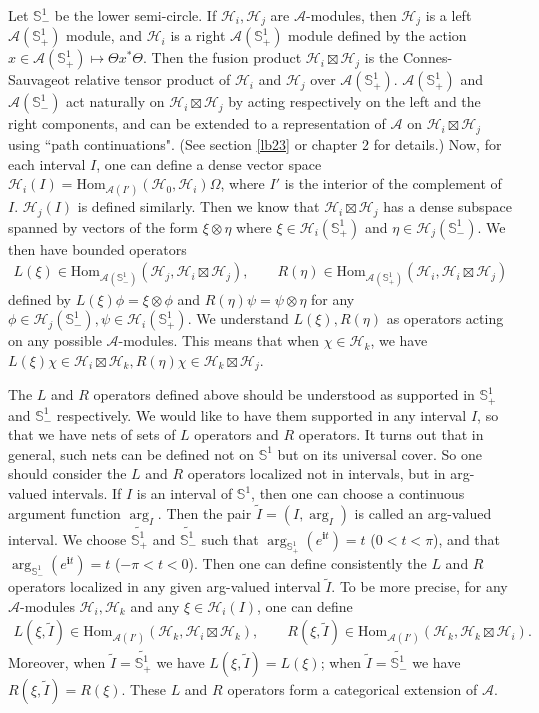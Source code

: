 \documentclass[12pt,a4paper]{article}
\theoremstyle{definition}
\theoremstyle{plain}
\newcommand{\mc}{\mathcal}
\newcommand{\wtd}{\widetilde}
\newcommand{\Hom}{\mathrm{Hom}}
\newcommand{\im}{\mathbf{i}}
\newcommand{\mbb}{\mathbb}
\numberwithin{equation}{section}
\begin{document}
Let $\mbb S^1_-$ be the lower semi-circle. If $\mc H_i,\mc H_j$ are $\mc A$-modules, then $\mc H_j$ is a left $\mc A(\mbb S^1_+)$ module, and $\mc H_i$ is a right $\mc A(\mbb S^1_+)$ module defined by the action $x\in\mc A(\mbb S^1_+)\mapsto \Theta x^*\Theta$. Then the fusion product $\mc H_i\boxtimes\mc H_j$ is the Connes-Sauvageot relative tensor product of $\mc H_i$ and $\mc H_j$ over $\mc A(\mbb S^1_+)$. $\mc A(\mbb S^1_+)$ and $\mc A(\mbb S^1_-)$ act naturally on $\mc H_i\boxtimes\mc H_j$ by acting respectively on the left and the right components, and can be extended  to a representation of $\mc A$ on $\mc H_i\boxtimes\mc H_j$ using ``path continuations". (See section \ref{lb23} or \cite{Gui21a} chapter 2 for details.) Now, for each  interval $I$, one can define a dense vector space $\mc H_i(I)=\Hom_{\mc A(I')}(\mc H_0,\mc H_i)\Omega$, where $I'$ is the interior of the complement of $I$. $\mc H_j(I)$ is defined similarly. Then we know that $\mc H_i\boxtimes\mc H_j$ has a dense subspace spanned by vectors of the form $\xi\otimes\eta$ where $\xi\in\mc H_i(\mbb S^1_+)$ and $\eta\in\mc H_j(\mbb S^1_-)$. We then have bounded operators
\begin{align*}
L(\xi)\in\Hom_{\mc A(\mbb S^1_-)}(\mc H_j,\mc H_i\boxtimes\mc H_j),\qquad R(\eta)\in\Hom_{\mc A(\mbb S^1_+)}(\mc H_i,\mc H_i\boxtimes\mc H_j)
\end{align*}
defined by $L(\xi)\phi=\xi\otimes\phi$ and $R(\eta)\psi=\psi\otimes\eta$ for any $\phi\in\mc H_j(\mbb S^1_-),\psi\in\mc H_i(\mbb S^1_+)$. We understand $L(\xi),R(\eta) $ as operators acting on any possible $\mc A$-modules. This means that when $\chi\in\mc H_k$, we have $L(\xi)\chi\in\mc H_i\boxtimes\mc H_k,R(\eta)\chi\in\mc H_k\boxtimes\mc H_j$.

The $L$ and $R$ operators defined above should be understood as supported in $\mbb S^1_+$ and $\mbb S^1_-$ respectively. We would like to have them supported in any interval $I$, so that we have  nets of sets of $L$ operators and $R$ operators. It turns out that in general,  such nets can be defined not on $\mbb S^1$ but on its universal cover. So one should consider the $L$ and $R$ operators localized not in intervals, but in arg-valued intervals. If $I$ is an interval of $\mbb S^1$, then one can choose a continuous argument function $\arg_I$. Then the pair $\wtd I=(I,\arg_I)$ is called an arg-valued interval. We choose $\wtd{\mbb S^1_+}$ and $\wtd{\mbb S^1_-}$ such that $\arg_{\mbb S^1_+}(e^{\im t})=t$ ($0<t<\pi$), and that $\arg_{\mbb S^1_-}(e^{\im t})=t$ ($-\pi<t<0$). Then one can define consistently the $L$ and $R$ operators  localized in any given arg-valued interval $\wtd I$. To be more precise, for any $\mc A$-modules $\mc H_i,\mc H_k$ and any $\xi\in\mc H_i(I)$, one can define
\begin{align*}
L(\xi,\wtd I)\in\Hom_{\mc A(I')}(\mc H_k,\mc H_i\boxtimes\mc H_k),\qquad R(\xi,\wtd I)\in\Hom_{\mc A(I')}(\mc H_k,\mc H_k\boxtimes\mc H_i).
\end{align*}
Moreover, when $\wtd I=\wtd{\mbb S^1_+}$ we have $L(\xi,\wtd I)=L(\xi)$; when $\wtd I=\wtd{\mbb S^1_-}$ we have $R(\xi,\wtd I)=R(\xi)$. These $L$ and $R$ operators form a categorical extension of $\mc A$.
\end{document}
